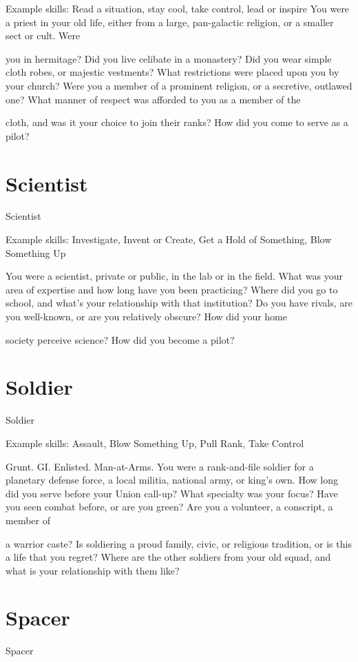 Example skills: Read a situation, stay cool, take control, lead or inspire
You were a priest in your old life, either from a large, pan-galactic religion, or a smaller sect or cult. Were

you in hermitage? Did you live celibate in a monastery? Did you wear simple cloth robes, or majestic
vestments? What restrictions were placed upon you by your church? Were you a member of a prominent
religion, or a secretive, outlawed one? What manner of respect was afforded to you as a member of the

cloth, and was it your choice to join their ranks? How did you come to serve as a pilot?


\section{Scientist}

                                                     Scientist

Example skills: Investigate, Invent or Create, Get a Hold of Something, Blow Something Up

You were a scientist, private or public, in the lab or in the field. What was your area of expertise and how
long have you been practicing? Where did you go to school, and what’s your relationship with that
institution? Do you have rivals, are you well-known, or are you relatively obscure? How did your home

society perceive science? How did you become a pilot?
\section{Soldier}
                                                       Soldier

Example skills: Assault, Blow Something Up, Pull Rank, Take Control

Grunt. GI. Enlisted. Man-at-Arms. You were a rank-and-file soldier for a planetary defense force, a local
militia, national army, or king’s own. How long did you serve before your Union call-up? What specialty was
your focus? Have you seen combat before, or are you green? Are you a volunteer, a conscript, a member of

a warrior caste? Is soldiering a proud family, civic, or religious tradition, or is this a life that you regret?
Where are the other soldiers from your old squad, and what is your relationship with them like?
\section{Spacer}
                                                       Spacer



